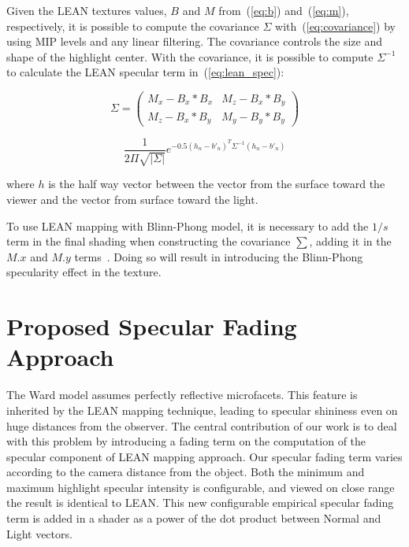 \documentclass[10pt, conference]{IEEEtran}
\begin{document}
Given the LEAN textures values, $B$ and $M$ from~(\ref{eq:b}) and~(\ref{eq:m}), respectively, it is possible to compute the covariance $\Sigma$ with~(\ref{eq:covariance}) by using MIP levels and any linear filtering. The covariance controls the size and shape of the highlight center. With the covariance, it is possible to compute $\Sigma^{-1}$ to calculate the LEAN specular term in~(\ref{eq:lean_spec}):

\begin{equation}
	\label{eq:covariance}
	\Sigma = \left( \begin{smallmatrix} M_{x} - B_{x} * B_{x} & M_{z} - B_{x} * B_{y}\\ M_{z} - B_{x} * B_{y} & M_{y} - B_{y} * B_{y} \end{smallmatrix} \right)
\end{equation}

\begin{equation}
	\label{eq:lean_spec}
	\dfrac{1}{2\Pi\sqrt{|\Sigma|}}e^{-0.5(h_{n} - b'_{n})^{T} \Sigma^{-1}(h_{n} - b'_{n})}
\end{equation}

where $h$ is the half way vector between the vector from the surface toward the viewer and the vector from surface toward the light.

To use LEAN mapping with Blinn-Phong model, it is necessary to add the $1 / s$ term in the final shading when constructing the covariance $∑$, adding it in the $M.x$ and $M.y$ terms~\cite{Olano:2010:LM:1730804.1730834}. Doing so will result in introducing the Blinn-Phong specularity effect in the texture.


\section{Proposed Specular Fading Approach}
\label{sec:specular_fading}
%
The Ward model assumes perfectly reflective microfacets. This feature is inherited by the LEAN mapping technique, leading to specular shininess even on huge distances from the observer. The central contribution of our work is to deal with this problem by introducing a fading term on the computation of the specular component of LEAN mapping approach. Our specular fading term varies according to the camera distance from the object. Both the minimum and maximum highlight specular intensity is configurable, and viewed on close range the result is identical to LEAN. This new configurable empirical specular fading term is added in a shader as a power of the dot product between Normal and Light vectors.
\end{document}
